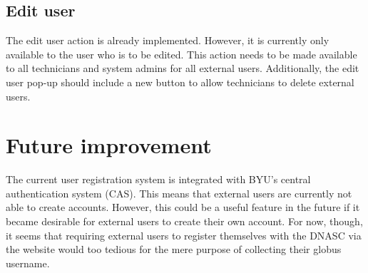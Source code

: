 \subsection{Edit user}

The edit user action is already implemented. However, it is currently only available
to the user who is to be edited. This action needs to be made available to all 
technicians and system admins for all external users. Additionally, the edit user
pop-up should include a new button to allow technicians to delete external users.

\section{Future improvement}
The current user registration system is integrated with BYU's central 
authentication system (CAS). This means that external users are currently not 
able to create accounts. However, this could be a useful feature in the future 
if it became desirable for external users to create their own account. For now, 
though, it seems that requiring external users to register themselves with the 
DNASC via the website would too tedious for the mere purpose of collecting their
globus username.

